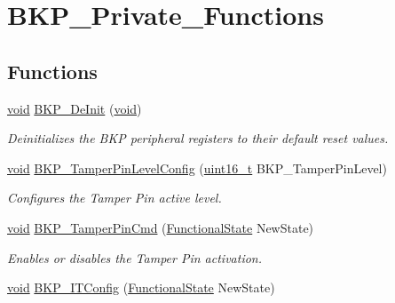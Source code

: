 \hypertarget{group___b_k_p___private___functions}{\section{B\-K\-P\-\_\-\-Private\-\_\-\-Functions}
\label{group___b_k_p___private___functions}
}
\subsection*{Functions}
\begin{DoxyCompactItemize}
\item 
\hyperlink{group___n_a_m_e_ga18028b8badbf1ea7e704ccac3c488e82}{void} \hyperlink{group___b_k_p___private___functions_gaabff4d8f5ebf4fd9a840bcc9042ca226}{B\-K\-P\-\_\-\-De\-Init} (\hyperlink{group___n_a_m_e_ga18028b8badbf1ea7e704ccac3c488e82}{void})
\begin{DoxyCompactList}\small\item\em Deinitializes the B\-K\-P peripheral registers to their default reset values. \end{DoxyCompactList}\item 
\hyperlink{group___n_a_m_e_ga18028b8badbf1ea7e704ccac3c488e82}{void} \hyperlink{group___b_k_p___private___functions_gae216446d641d075fb575ce6dbe2ff4c1}{B\-K\-P\-\_\-\-Tamper\-Pin\-Level\-Config} (\hyperlink{stdint_8h_a273cf69d639a59973b6019625df33e30}{uint16\-\_\-t} B\-K\-P\-\_\-\-Tamper\-Pin\-Level)
\begin{DoxyCompactList}\small\item\em Configures the Tamper Pin active level. \end{DoxyCompactList}\item 
\hyperlink{group___n_a_m_e_ga18028b8badbf1ea7e704ccac3c488e82}{void} \hyperlink{group___b_k_p___private___functions_ga3a0cdff9ad8238ade2c67e2b70f530ac}{B\-K\-P\-\_\-\-Tamper\-Pin\-Cmd} (\hyperlink{group___exported__types_gac9a7e9a35d2513ec15c3b537aaa4fba1}{Functional\-State} New\-State)
\begin{DoxyCompactList}\small\item\em Enables or disables the Tamper Pin activation. \end{DoxyCompactList}\item 
\hyperlink{group___n_a_m_e_ga18028b8badbf1ea7e704ccac3c488e82}{void} \hyperlink{group___b_k_p___private___functions_gab8dbd0c4773f6edb98a28c8ff6a2ead0}{B\-K\-P\-\_\-\-I\-T\-Config} (\hyperlink{group___exported__types_gac9a7e9a35d2513ec15c3b537aaa4fba1}{Functional\-State} New\-State)

\end{DoxyCompactItemize}
